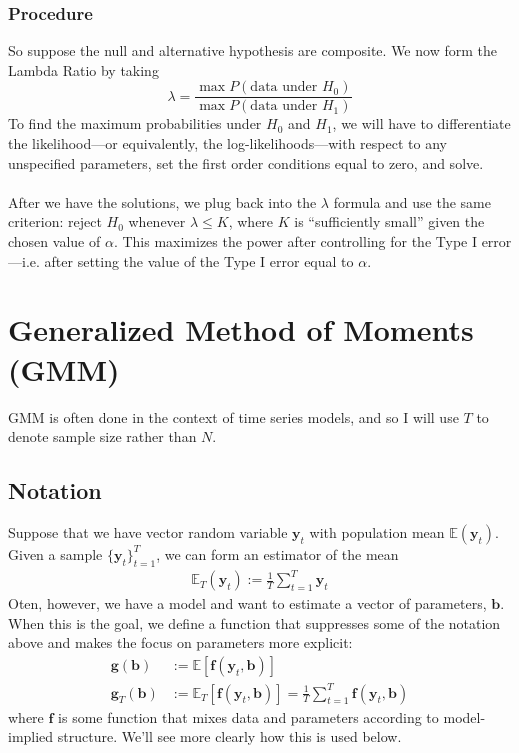 \documentclass[12pt]{article}
\theoremstyle{plain}
\theoremstyle{definition}
\theoremstyle{remark}
\newcommand{\bsb}{\boldsymbol{b}}
\newcommand{\bsg}{\boldsymbol{g}}
\newcommand{\bsy}{\boldsymbol{y}}
\begin{document}
\subsubsection{Procedure}

So suppose the null and alternative hypothesis are composite.
We now form the Lambda Ratio by taking
\[ \lambda =
   \frac{\max P(\text{data under $H_0$})}{
      \max P(\text{data under $H_1$})}
   \]
To find the maximum probabilities under $H_0$ and $H_1$, we
will have to differentiate the likelihood---or equivalently, the
log-likelihoods---with respect to any unspecified parameters, set
the first order conditions equal to zero, and solve.
\\
\\
After we have the solutions, we plug back into the $\lambda$ formula
and use the same criterion:
reject $H_0$ whenever $\lambda\leq K$,
where $K$ is ``sufficiently small'' given the chosen value of $\alpha$.
This maximizes the power after controlling for the Type I error---i.e.
after setting the value of the Type I error equal to $\alpha$.


\clearpage
\section{Generalized Method of Moments (GMM)}

GMM is often done in the context of time series models, and so I will
use $T$ to denote sample size rather than $N$.

\subsection{Notation}

Suppose that we have vector random variable $\bsy_t$ with
population mean $\mathbb{E}(\bsy_t)$. Given a sample
$\{\bsy_t\}^T_{t=1}$, we can form an estimator of the mean
\begin{align*}
  \mathbb{E}_T(\bsy_t)
  := \frac{1}{T} \sum^T_{t=1} \bsy_t
\end{align*}
Oten, however, we have a model and want to estimate a vector of
parameters, $\bsb$. When this is the goal, we define a function
that suppresses some of the notation above and makes the focus on
parameters more explicit:
\begin{align*}
  \bsg(\bsb)
  &:= \mathbb{E}[\boldsymbol{f}(\bsy_t,\bsb)]\\
  \bsg_T(\bsb)
  &:= \mathbb{E}_T[\boldsymbol{f}(\bsy_t,\bsb)]
  = \frac{1}{T}\sum^T_{t=1}
      \boldsymbol{f}(\bsy_t,\bsb)
\end{align*}
where $\boldsymbol{f}$ is some function that mixes data and parameters
according to model-implied structure. We'll see more clearly how this is
used below.
\end{document}
